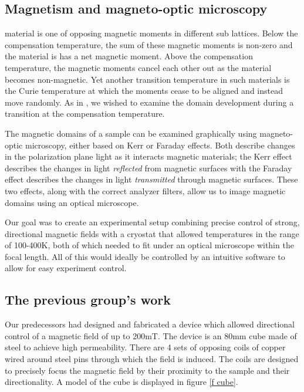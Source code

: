 \documentclass[journal]{IEEEtran}
\begin{document}
\subsection{Magnetism and magneto-optic microscopy}
 material is one of opposing magnetic moments in different sub lattices. Below the compensation temperature, the sum of these magnetic moments is non-zero and the material is has a net magnetic moment. Above the compensation temperature, the magnetic moments cancel each other out as the material becomes non-magnetic. Yet another transition temperature in such materials is the Curie temperature at which the moments cease to be aligned and instead move randomly. As in \cite{garnet}, we wished to examine the domain development during a transition at the compensation temperature.

The magnetic domains of a sample can be examined graphically using magneto-optic microscopy, either based on Kerr or Faraday effects. Both describe changes in the polarization plane light as it interacts magnetic materials; the Kerr effect describes the changes in light \emph{reflected} from magnetic surfaces with the Faraday effect describes the changes in light \emph{transmitted} through magnetic surfaces. These two effects, along with the correct analyzer filters, allow us to image magnetic domains using an optical microscope.

Our goal was to create an experimental setup combining precise control of strong, directional magnetic fields with a cryostat that allowed temperatures in the range of 100-400K, both of which needed to fit under an optical microscope within the focal length. All of this would ideally be controlled by an intuitive software to allow for easy experiment control.

\subsection{The previous group's work}
Our predecessors had designed and fabricated a device which allowed directional control of a magnetic field of up to 200mT. The device is an 80mm cube made of steel to achieve high permeability. There are 4 sets of opposing coils of copper wired around steel pins through which the field is induced. The coils are designed to precisely focus the magnetic field by their proximity to the sample and their directionality. A model of the cube is displayed in figure \ref{f cube}.
\end{document}
